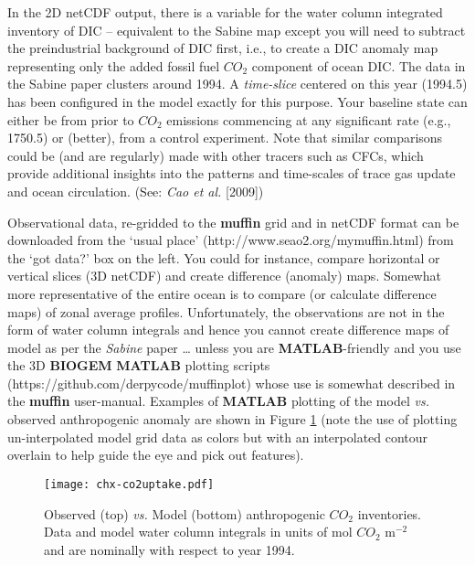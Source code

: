 \documentclass[11pt,fleqn]{book} %
\begin{document}
In the 2D netCDF output, there is a variable for the water column integrated inventory of DIC – equivalent to the Sabine map except you will need to subtract the preindustrial background of DIC first, i.e., to create a DIC anomaly map representing only the added fossil fuel \(CO_{2}\) component of ocean DIC. The data in the Sabine paper clusters around 1994. A \textit{time-slice} centered on this year (1994.5) has been configured in the model exactly for this purpose. Your baseline state can either be from prior to \(CO_{2}\) emissions commencing at any significant rate (e.g., 1750.5) or (better), from a control experiment. Note that similar comparisons could be (and are regularly) made with other tracers such as CFCs, which provide additional insights into the patterns and time-scales of trace gas update and ocean circulation. (See: \textit{Cao et al.} [2009])

Observational data, re-gridded to the \textbf{muffin} grid and in netCDF format can be downloaded from the ‘usual place’ (http://www.seao2.org/mymuffin.html) from the ‘got data?’ box on the left. You could for instance, compare horizontal or vertical slices (3D netCDF) and create difference (anomaly) maps. Somewhat more representative of the entire ocean is to compare (or calculate difference maps) of zonal average profiles. Unfortunately, the observations are not in the form of water column integrals and hence you cannot create difference maps of model as per the \textit{Sabine} paper … unless you are \textbf{MATLAB}-friendly and you use the 3D \textbf{BIOGEM} \textbf{MATLAB} plotting scripts (https://github.com/derpycode/muffinplot) whose use is somewhat described in the \textbf{muffin} user-manual. Examples of \textbf{MATLAB} plotting of the model \textit{vs.} observed anthropogenic anomaly are shown in Figure \ref{fig:chx-co2uptake} (note the use of plotting un-interpolated model grid data as colors but with an interpolated contour overlain to help guide the eye and pick out features).

\begin{figure}[ht]
\begin{center}
\texttt{[image: chx-co2uptake.pdf]}
\end{center}
\vspace{-10pt}
\caption{Observed (top) \textit{vs.} Model (bottom) anthropogenic \(CO_{2}\) inventories.
Data and model water column integrals in units of mol \(CO_{2}\) m$^{-2}$ and are nominally with respect to year 1994.}
\label{fig:chx-co2uptake}
\end{figure}
\end{document}
